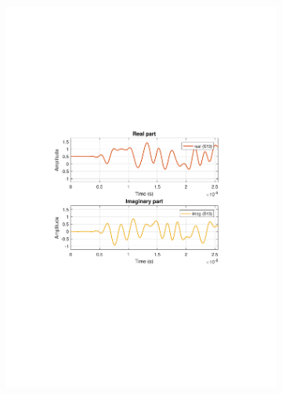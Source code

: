 \begin{refsection}
\begin{figure}[h!]
\centering
\begin{subfigure}{.5\textwidth}
  \centering
  \includegraphics[width=\linewidth]{./sdf/dsp_laser_phase_compensation/figures/S13_td.pdf}
  \caption{}
  \label{fig:sub1}
\end{subfigure}%
\begin{subfigure}{.5\textwidth}
  \centering

\end{subfigure}
\end{figure}
\end{refsection}
